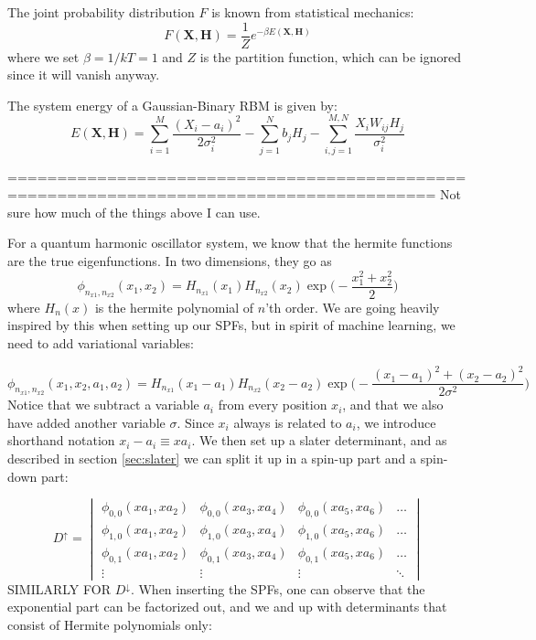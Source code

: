 The joint probability distribution $F$ is known from statistical mechanics:
\begin{equation}
\label{eq:F_rbm}
F(\boldsymbol{X},\boldsymbol{H})=\frac{1}{Z}e^{-\beta E(\boldsymbol{X},\boldsymbol{H})}
\end{equation}
where we set $\beta=1/kT=1$ and $Z$ is the partition function, which can be ignored since it will vanish anyway. 

The system energy of a Gaussian-Binary RBM is given by:
\begin{equation}
E(\boldsymbol{X},\boldsymbol{H})=\sum_{i=1}^{M}\frac{(X_i-a_i)^2}{2\sigma_i^2}-\sum_{j=1}^Nb_jH_j-\sum_{i,j=1}^{M,N}\frac{X_iW_{ij}H_j}{\sigma_i^2}
\end{equation}

=========================================================================================
Not sure how much of the things above I can use.
\fi

For a quantum harmonic oscillator system, we know that the hermite functions are the true eigenfunctions. In two dimensions, they go as
\begin{equation}
\phi_{n_{x1},n_{x2}}(x_1,x_2)=H_{n_{x1}}(x_1)H_{n_{x2}}(x_2)\exp\Big(-\frac{x_1^2+x_2^2}{2}\Big)
\end{equation}
where $H_n(x)$ is the hermite polynomial of $n$'th order. We are going heavily inspired by this when setting up our SPFs, but in spirit of machine learning, we need to add variational variables:

\begin{equation}
\phi_{n_{x1},n_{x2}}(x_1,x_2,a_1,a_2)=H_{n_{x1}}(x_1-a_1)H_{n_{x2}}(x_2-a_2)\exp\Big(-\frac{(x_1-a_1)^2+(x_2-a_2)^2}{2\sigma^2}\Big)
\end{equation}
Notice that we subtract a variable $a_i$ from every position $x_i$, and that we also have added another variable $\sigma$. Since $x_i$ always is related to $a_i$, we introduce shorthand notation $x_i-a_i\equiv xa_i$. We then set up a slater determinant, and as described in section \ref{sec:slater} we can split it up in a spin-up part and a spin-down part:

\begin{equation}
D^{\uparrow}=
\begin{vmatrix} 
\phi_{0,0}(xa_1,xa_2)&\phi_{0,0}(xa_3,xa_4)&\phi_{0,0}(xa_5,xa_6)&\hdots \\
\phi_{1,0}(xa_1,xa_2)&\phi_{1,0}(xa_3,xa_4)&\phi_{1,0}(xa_5,xa_6)&\hdots \\
\phi_{0,1}(xa_1,xa_2)&\phi_{0,1}(xa_3,xa_4)&\phi_{0,1}(xa_5,xa_6)&\hdots \\
\vdots&\vdots&\vdots&\ddots
\end{vmatrix}
\end{equation}
SIMILARLY FOR $D^{\downarrow}$. When inserting the SPFs, one can observe that the exponential part can be factorized out, and we and up with determinants that consist of Hermite polynomials only:

